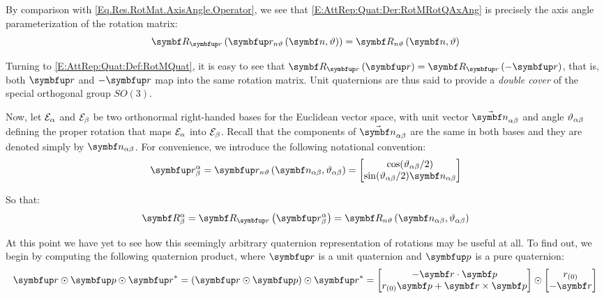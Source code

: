 By comparison with \eqref{Eq.Res.RotMat.AxisAngle.Operator}, we see that \eqref{E:AttRep:Quat:Der:RotMRotQAxAng} is precisely the axis angle parameterization of the rotation matrix:
\begin{equation*}
\RotMQuat{\RotQAxAng{\mcol{\rotax}}{\rotang}} = \RotMAxAng{\mcol{\rotax}}{\rotang}
\end{equation*}

Turning to \eqref{E:AttRep:Quat:Def:RotMQuat}, it is easy to see that $\RotMQuat{\quat{\unitq}}=\RotMQuat{-\quat{\unitq}}$, that is, both $\quat{\unitq}$ and $-\quat{\unitq}$ map into the same rotation matrix. Unit quaternions are thus said to provide a \emph{double cover} of the special orthogonal group $SO(3)$.

Now, let $\basis[\alpha]$ and $\basis[\beta]$ be two orthonormal right-handed bases for the Euclidean vector space, with unit vector $\varel{\rotax}{\alpha}{\beta}$ and angle $\rel{\rotang}{\alpha}{\beta}$ defining the proper rotation that maps $\basis[\alpha]$ into $\basis[\beta]$. Recall that the components of $\varel{\rotax}{\alpha}{\beta}$ are the same in both bases and they are denoted simply by $\vrel{\rotax}{\alpha}{\beta}$. For convenience, we introduce the following notational convention:
\begin{equation} \label{E:AttRep:Quat:Def:RotQ}
\RotQ{\alpha}{\beta} = \RotQAxAng{\vrel{\rotax}{\alpha}{\beta}}{\rel{\rotang}{\alpha}{\beta}} = \qcol{\cos (\rel{\rotang}{\alpha}{\beta}/2)}{\sin (\rel{\rotang}{\alpha}{\beta}/2) \vrel{\rotax}{\alpha}{\beta}}
\end{equation}

So that:
\begin{equation} \label{E:AttRep:Quat:Res:RotMQuatAlphaBeta}
\RotM{\alpha}{\beta} = \RotMQuat{\RotQ{\alpha}{\beta}}=\RotMAxAng{\vrel{\rotax}{\alpha}{\beta}}{\rel{\rotang}{\alpha}{\beta}}
\end{equation}

At this point we have yet to see how this seemingly arbitrary quaternion representation of rotations may be useful at all. To find out, we begin by computing the following quaternion product, where $\quat{\rotq}$ is a unit quaternion and $\quat{p}$ is a pure quaternion:
\begin{equation} \label{E:AttRep:Quat:Der:RotQ1}
\quat{\rotq} \qprod \quat{p} \qprod \qcon{\quat{\rotq}} = \left(\quat{\rotq} \qprod \quat{p}\right) \qprod \qcon{\quat{\rotq}} = \qcol{ - \qvec{\rotq} \cdot \qvec{p}}{\qreal{\rotq}\qvec{p} + \qvec{\rotq} \times \qvec{p}} \qprod \qcol{\qreal{\rotq}}{-\qvec{\rotq}}
\end{equation}

